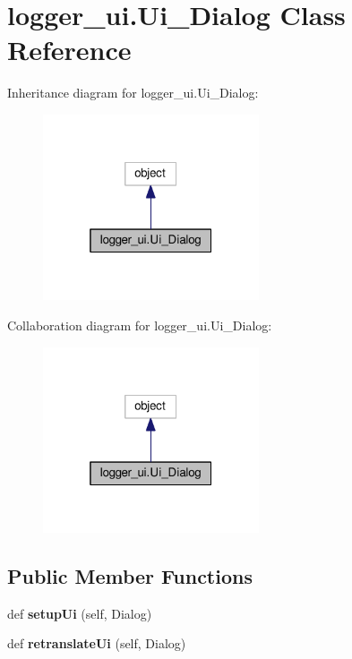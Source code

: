 \hypertarget{classlogger__ui_1_1_ui___dialog}{}\section{logger\+\_\+ui.\+Ui\+\_\+\+Dialog Class Reference}
\label{classlogger__ui_1_1_ui___dialog}


Inheritance diagram for logger\+\_\+ui.\+Ui\+\_\+\+Dialog\+:\nopagebreak
\begin{figure}[H]
\begin{center}
\leavevmode
\includegraphics[width=181pt]{classlogger__ui_1_1_ui___dialog__inherit__graph}
\end{center}
\end{figure}


Collaboration diagram for logger\+\_\+ui.\+Ui\+\_\+\+Dialog\+:\nopagebreak
\begin{figure}[H]
\begin{center}
\leavevmode
\includegraphics[width=181pt]{classlogger__ui_1_1_ui___dialog__coll__graph}
\end{center}
\end{figure}
\subsection*{Public Member Functions}
\begin{DoxyCompactItemize}
\item 
def {\bfseries setup\+Ui} (self, Dialog)\hypertarget{classlogger__ui_1_1_ui___dialog_a6325fa9cb21548c0ef2f962455270708}{}\label{classlogger__ui_1_1_ui___dialog_a6325fa9cb21548c0ef2f962455270708}

\item 
def {\bfseries retranslate\+Ui} (self, Dialog)\hypertarget{classlogger__ui_1_1_ui___dialog_a222c724c64abdb2c404e2facba44b351}{}\label{classlogger__ui_1_1_ui___dialog_a222c724c64abdb2c404e2facba44b351}

\end{DoxyCompactItemize}
